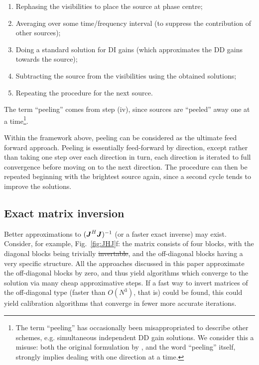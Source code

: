 \documentclass[useAMS,usenatbib]{mn2e}
\newcommand{\mat}[1]{{\bmath{#1}}}
\newcommand{\JJ}{\mat{J}} %
\newcommand{\JHJ}{\JJ^H\JJ} %
\numberwithin{equation}{section}
\providecommand{\DIFadd}[1]{{\protect\color{blue}\uwave{#1}}} %
\providecommand{\DIFdel}[1]{{\protect\color{red}\sout{#1}}}                      %
\providecommand{\DIFaddbegin}{} %
\providecommand{\DIFaddend}{} %
\providecommand{\DIFdelbegin}{} %
\providecommand{\DIFdelend}{} %
\begin{document}
\begin{enumerate}
\item Rephasing the visibilities to place the source at phase centre;
\item Averaging over some time/frequency interval (to suppress the contribution of other sources);
\item Doing a standard solution for DI gains (which approximates the DD gains towards the source);
\item Subtracting the source from the visibilities using the obtained solutions;
\item Repeating the procedure for the next source.
\end{enumerate}

The term ``peeling'' comes from step (iv), since sources are ``peeled'' away one at a time\footnote{The term ``peeling'' has 
occasionally been misappropriated to describe other schemes, e.g. simultaneous independent DD gain solutions. We consider this a 
misuse: both the original formulation by \citet{JEN:peeling}, and the word ``peeling'' itself, strongly implies dealing with 
one direction at a time.}.

Within the framework above, peeling can be considered as the ultimate feed forward approach. Peeling is essentially feed-forward by direction, except rather than taking one step over each direction in turn, each direction is iterated to full convergence before moving on to the next direction. The procedure can then be repeated beginning with the brightest source again, since a second cycle tends to improve the solutions. 

\subsection{Exact matrix inversion}

Better approximations to $(\JHJ)^{-1}$ (or a faster exact inverse) may exist. Consider, for example, Fig.~\ref{fig:JHJ}f: 
the matrix consists of four blocks, with the diagonal blocks being trivially \DIFdelbegin \DIFdel{invertable}\DIFdelend \DIFaddbegin \DIFadd{invertible}\DIFaddend , and the off-diagonal blocks having a 
very specific structure. All the approaches discussed in this paper approximate the off-diagonal blocks by zero, and thus 
yield algorithms which converge to the solution via many cheap approximative steps. If a fast way to invert matrices of the 
off-diagonal type (faster than $O(N^3)$, that is) could be found, this could yield calibration algorithms that converge in fewer 
more accurate iterations.
\end{document}
